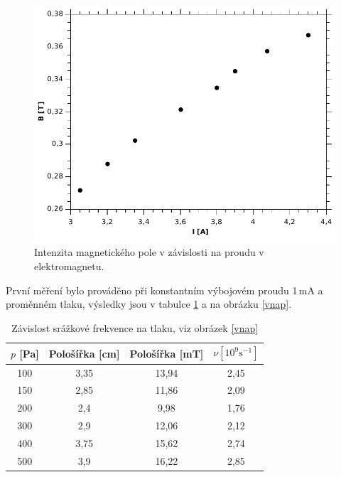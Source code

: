 \documentclass[12pt]{article}
\begin{document}
\begin{figure}[!htbp]
\begin{center}
\includegraphics[width=12cm]{Graph1.pdf}
\caption{Intenzita magnetického pole v závislosti na proudu v elektromagnetu.}
\label{magnet}
\end{center}
\end{figure}

První měření bylo prováděno při konstantním výbojovém proudu  1\,mA a proměnném tlaku, výsledky jsou v tabulce \ref{t1} a na obrázku \ref{vnap}.

\begin{table}[htbp]
\begin{center}
\begin{tabular}{|c|c|c|c|}
\hline
$p$ [Pa] & Pološířka [cm] & Pološířka [mT] & $\nu [10^9 \mathrm{s}^{-1}]$ \\ \hline
100 & 3,35 & 13,94 & 2,45 \\ \hline
150 & 2,85 & 11,86 & 2,09 \\ \hline
200 & 2,4 & 9,98 & 1,76 \\ \hline
300 & 2,9 & 12,06 & 2,12 \\ \hline
400 & 3,75 & 15,62 & 2,74 \\ \hline
500 & 3,9 & 16,22 & 2,85 \\ \hline
\end{tabular}
\caption{Závislost srážkové frekvence na tlaku, viz obrázek \ref{vnap}}
\label{t1}
\end{center}
\end{table}
\end{document}
